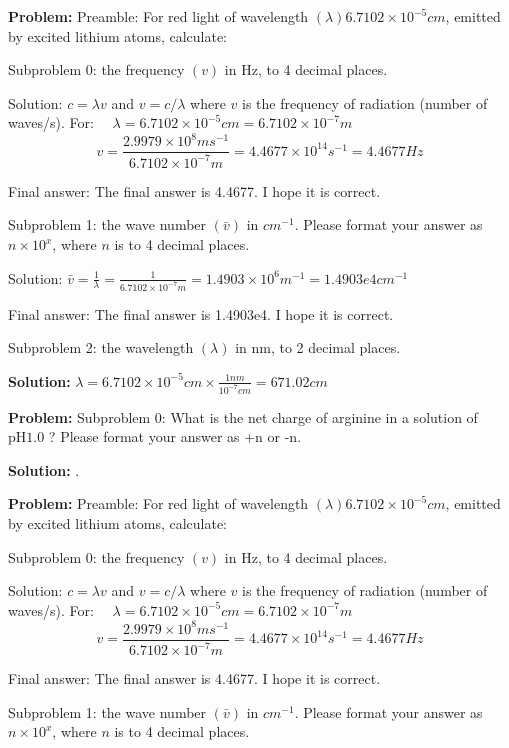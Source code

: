 \documentclass[10pt]{article}
\begin{document}
\textbf{Problem:}
Preamble: For red light of wavelength $(\lambda) 6.7102 \times 10^{-5} cm$, emitted by excited lithium atoms, calculate:

Subproblem 0: the frequency $(v)$ in Hz, to 4 decimal places. 


Solution: $c=\lambda v$ and $v=c / \lambda$ where $v$ is the frequency of radiation (number of waves/s).
For: $\quad \lambda=6.7102 \times 10^{-5} cm=6.7102 \times 10^{-7} m$
\[
v=\frac{2.9979 \times 10^{8} {ms}^{-1}}{6.7102 \times 10^{-7} m}=4.4677 \times 10^{14} {s}^{-1}= \boxed{4.4677} Hz
\]

Final answer: The final answer is 4.4677. I hope it is correct.

Subproblem 1: the wave number $(\bar{v})$ in ${cm}^{-1}$. Please format your answer as $n \times 10^x$, where $n$ is to 4 decimal places. 


Solution: $\bar{v}=\frac{1}{\lambda}=\frac{1}{6.7102 \times 10^{-7} m}=1.4903 \times 10^{6} m^{-1}= \boxed{1.4903e4} {cm}^{-1}$

Final answer: The final answer is 1.4903e4. I hope it is correct.

Subproblem 2: the wavelength $(\lambda)$ in nm, to 2 decimal places. 


\textbf{Solution:}
$\lambda=6.7102 \times 10^{-5} cm \times \frac{1 nm}{10^{-7} cm}= \boxed{671.02} cm$


\textbf{Problem:}
Subproblem 0: What is the net charge of arginine in a solution of $\mathrm{pH} \mathrm{} 1.0$ ? Please format your answer as +n or -n. 


\textbf{Solution:}
.


\textbf{Problem:}
Preamble: For red light of wavelength $(\lambda) 6.7102 \times 10^{-5} cm$, emitted by excited lithium atoms, calculate:

Subproblem 0: the frequency $(v)$ in Hz, to 4 decimal places. 


Solution: $c=\lambda v$ and $v=c / \lambda$ where $v$ is the frequency of radiation (number of waves/s).
For: $\quad \lambda=6.7102 \times 10^{-5} cm=6.7102 \times 10^{-7} m$
\[
v=\frac{2.9979 \times 10^{8} {ms}^{-1}}{6.7102 \times 10^{-7} m}=4.4677 \times 10^{14} {s}^{-1}= \boxed{4.4677} Hz
\]

Final answer: The final answer is 4.4677. I hope it is correct.

Subproblem 1: the wave number $(\bar{v})$ in ${cm}^{-1}$. Please format your answer as $n \times 10^x$, where $n$ is to 4 decimal places. 
\end{document}
